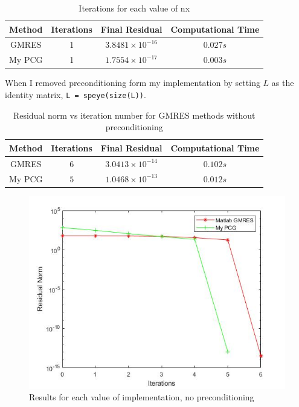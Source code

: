 \documentclass[a4paper, 11pt]{article}
\begin{document}
		\begin{table}[H]
			\centering
			\begin{tabular}{c|c|c|c}
				\textbf{Method} &  \textbf{Iterations} 	& \textbf{Final Residual} 		& \textbf{Computational Time} 	\\ \hline
				GMRES 			& 			1 			& $ 3.8481 \times 10^{-16} $	& $ 0.027 s $	\\ \hline	
				My PCG 			& 			1			& $ 1.7554 \times 10^{-17} $	& $ 0.003 s $	\\ \hline
			\end{tabular}
			\caption{Iterations for each value of nx}
			\label{table:ex6_c_prec}
		\end{table}	
	
		When I removed preconditioning form my implementation by setting $L$ as the identity matrix, \texttt{L = speye(size(L))}.
			
		\begin{table}[H]
			\centering
			\begin{tabular}{c|c|c|c}
				\textbf{Method} &  \textbf{Iterations} 	& \textbf{Final Residual} 		& \textbf{Computational Time} 	\\ \hline
				GMRES			& 			$6$ 		& $ 3.0413 \times 10^{-14} $ 	& $ 0.102 s $	\\ \hline	
				My PCG 			& 			$5$			& $ 1.0468 \times 10^{-13} $	& $ 0.012 s $	\\ \hline
			\end{tabular}
			\caption{Residual norm vs iteration number for GMRES methods without preconditioning}
			\label{table:ex6_c_NoPrec}
		\end{table}
	
		\begin{figure}[H]
			\centering
			\includegraphics[width=.6\linewidth]{ex6b.jpg}
			\caption{Results for each value of implementation, no preconditioning}
			\label{fig:ex6_c_NoPrec}
		\end{figure}
	
\end{document}

